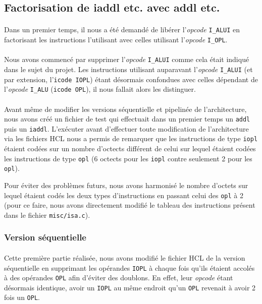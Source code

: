 \documentclass[12pt]{article}
\begin{document}
\subsection{Factorisation de iaddl etc. avec addl etc.}
\paragraph{}Dans un premier temps, il nous a été demandé de libérer l'{\itshape opcode} \verb+I_ALUI+ en factorisant les instructions l'utilisant avec celles utilisant l'{\itshape opcode} \verb+I_OPL+.

\paragraph{}Nous avons commencé par supprimer l'{\itshape opcode} \verb+I_ALUI+ comme cela était indiqué dans le sujet du projet. Les instructions utilisant auparavant l'{\itshape opcode} \verb+I_ALUI+ (et par extension, l'\verb+icode IOPL+) étant désormais confondues avec celles dépendant de l'{\itshape opcode} \verb+I_ALU+ (\verb+icode OPL+), il nous fallait alors les distinguer.

\paragraph{}Avant même de modifier les versions séquentielle et pipelinée de l'architecture, nous avons créé un fichier de test qui effectuait dans un premier temps un \verb+addl+ puis un \verb+iaddl+. L'exécuter avant d'effectuer toute modification de l'architecture via les fichiers HCL nous a permis de remarquer que les instructions de type \verb+iopl+ étaient codées sur un nombre d'octects différent de celui sur lequel étaient codées les instructions de type \verb+opl+ (6 octects pour les \verb+iopl+ contre seulement 2 pour les \verb+opl+).

Pour éviter des problèmes futurs, nous avons harmonisé le nombre d'octets sur lequel étaient codés les deux types d'instructions en passant celui des \verb+opl+ à 2 (pour ce faire, nous avons directement modifié le tableau des instructions présent dans le fichier \verb+misc/isa.c+).

\subsubsection{Version séquentielle}
\paragraph{}Cette première partie réalisée, nous avons modifié le fichier HCL de la version séquentielle en supprimant les opérandes \verb+IOPL+ à chaque fois qu'ils étaient accolés à des opérandes \verb+OPL+ afin d'éviter des doublons. En effet, leur {\itshape opcode} étant désormais identique, avoir un \verb+IOPL+ au même endroit qu'un \verb+OPL+ revenait à avoir 2 fois un \verb+OPL+.
\end{document}
